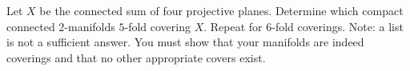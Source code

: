 Let $X$ be the connected sum of four projective planes. Determine
which compact connected $2$-manifolds $5$-fold covering $X$. Repeat
for $6$-fold coverings. Note: a list is not a sufficient answer. You
must show that your manifolds are indeed coverings and that no other
appropriate covers exist.

